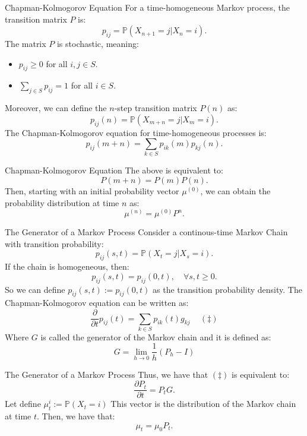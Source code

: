 \documentclass[aspectratio=169,xcolor=dvipsnames]{beamer}
\begin{document}
\begin{frame}{Chapman-Kolmogorov Equation}
    For a time-homogeneous Markov process, the transition matrix $P$ is:
    $$
    p_{ij} = \mathbb{P}(X_{n+1} = j | X_n = i).
    $$
    The matrix $P$ is stochastic, meaning:
    \begin{itemize}
        \item $p_{ij} \geq 0$ for all $i,j \in S$.
        \item $\sum_{j \in S} p_{ij} = 1$ for all $i \in S$.
    \end{itemize}
    Moreover, we can define the $n$-step transition matrix $P(n)$ as:
    $$
    p_{ij}(n) = \mathbb{P}(X_{m+n} = j | X_m = i).
    $$
    The Chapman-Kolmogorov equation for time-homogeneous processes is:
    $$
    p_{ij}(m + n) = \sum_{k \in S} p_{ik}(m) p_{kj}(n).
    $$
\end{frame}

\begin{frame}{Chapman-Kolmogorov Equation}
    The above is equivalent to:
    $$
    P(m + n) = P(m)P(n).
    $$
    Then, starting with an initial probability vector $\mu^{(0)}$, we can obtain the probability distribution at time $n$ as:
    $$
    \mu^{(n)} = \mu^{(0)} P^n.
    $$
\end{frame}

\begin{frame}{The Generator of a Markov Process}
    Consider a continous-time Markov Chain with transition probability:
    $$
    p_{ij}(s,t) = \mathbb{P}(X_t = j | X_s = i).
    $$
    If the chain is homogeneous, then:
    $$
    p_{ij}(s,t) = p_{ij}(0,t), \quad \forall s,t \geq 0.
    $$
    So we can define $p_{ij}(s,t) := p_{ij}(0,t)$ as the transition probability density. The Chapman-Kolmogorov equation can be written as:
    $$
    \frac{\partial}{\partial t} p_{ij}(t) = \sum_{k \in S} p_{ik}(t) g_{kj} \quad \, \left(\ddagger\right)
    $$
    Where $G$ is called the generator of the Markov chain and it is defined as:
    $$
    G = \lim_{h \to 0} \frac{1}{h} (P_h - I)
    $$
\end{frame}

\begin{frame}{The Generator of a Markov Process}
    Thus, we have that $\left(\ddagger\right)$ is equivalent to:
    $$
    \frac{\partial P_t}{\partial t} = P_t G.
    $$
    Let define $\mu_t^i := \mathbb{P}(X_t = i)$ This vector is the distribution of the Markov chain at time $t$. Then, we have that:
    $$
    \mu_t = \mu_0 P_t.
    $$
\end{frame}
\end{document}
